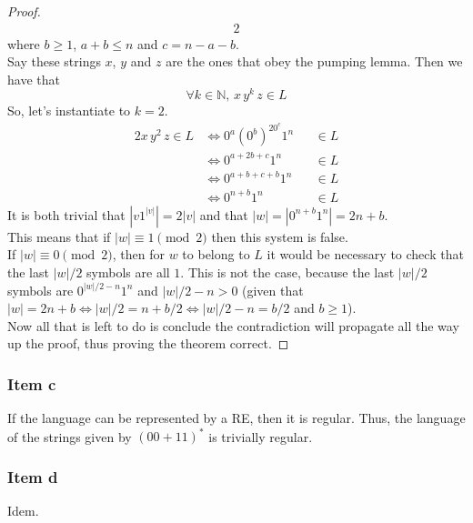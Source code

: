 {\begin{proof}
\begin{alignat*}{2}
\end{alignat*}
where $b \geq 1$, $a+b \leq n$ and $c=n-a-b$.\\
Say these strings $x$, $y$ and $z$ are the ones that obey the pumping lemma. Then we have that
\begin{equation*}
	\forall k \in \mathbb{N},\,x\,y^k\,z \in L
\end{equation*}
So, let's instantiate to $k=2$.
\begin{alignat*}{2}
	x\,y^2\,z \in L
	& \iff 0^a(0^b)^20^c1^n &&\in L \\
	& \iff 0^{a+2b+c}1^n    &&\in L \\
	& \iff 0^{a+b+c+b}1^n   &&\in L \\
	& \iff 0^{n+b}1^n       &&\in L
\end{alignat*}
It is both trivial that $|v 1^{|v|} | = 2|v|$ and that $|w|=|0^{n+b}1^n|=2n+b$.\\
This means that if $|w| \equiv 1 \pmod{2}$ then this system is false.\\
If $|w| \equiv 0 \pmod{2}$, then for $w$ to belong to $L$ it would be necessary to check that the last $|w|/2$ symbols are all $1$. This is not the case, because the last $|w|/2$ symbols are $0^{|w|/2-n}1^n$ and $|w|/2-n > 0$ (given that $|w|=2n+b \iff |w|/2=n+b/2 \iff |w|/2-n=b/2$ and $b \geq 1$).\\
Now all that is left to do is conclude the contradiction will propagate all the way up the proof, thus proving the theorem correct.
\end{proof}
\subsubsection{Item c}
If the language can be represented by a RE, then it is regular. Thus, the language of the strings given by $(00+11)^*$ is trivially regular.
\subsubsection{Item d}
Idem.
}

